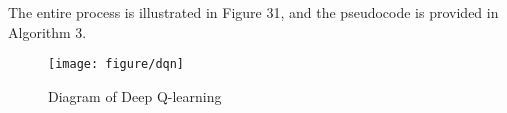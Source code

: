 \documentclass{article}
\begin{document}
The entire process is illustrated in Figure 31, and the pseudocode is provided in Algorithm 3.

\begin{figure}[htbp]
        \centering
        \texttt{[image: figure/dqn]}
        \caption{Diagram of Deep Q-learning}
\end{figure}

\hspace*{\fill}


\begin{comment}
\begin{algorithm}
\caption{Deep Q-learning with Experience Replay}
\begin{algorithmic}
\State Initialize replay memory $D$ to capacity $N$
\State Initialize action-value function $Q$ with random weights
\For{episode $= 1, M$}
    \State Initialize sequence $s_1 = \{x_1\}$ and preprocessed sequence $\varphi_1 = \varphi(s_1)$
    \For{time step $t = 1, T$}
        \State With probability $\varepsilon$ select a random action $a_t$
        \State otherwise select $a_t = \max_a Q^*(\varphi(s_t), a; \theta)$
        \State Execute action $a_t$ and observe reward $r_t$ and state $x_{t+1}$
        \State Set $s_{t+1} = s_t, a_t, x_{t+1}$ and preprocess $\varphi_{t+1} = \varphi(s_{t+1})$
        \State Store transition $(\varphi_t, a_t, r_t, \varphi_{t+1})$ in $D$
        \State Sample random minibatch of transitions $(\varphi_j , a_j , r_j , \varphi_{j+1})$ from $D$
        \State Set $y_j = \begin{cases}
        r_j & \text{for terminal } \varphi_{j+1} \\
        r_j + \gamma \max_{a_0} Q(\varphi_{j+1}, a_0; \theta) & \text{for non-terminal } \varphi_{j+1}
        \end{cases}$
        \State Perform a gradient descent step on $(y_j - Q(\varphi_j , a_j ; \theta))^2$
    \EndFor
\EndFor
\end{algorithmic}
\end{algorithm}
\end{comment}
\end{document}
